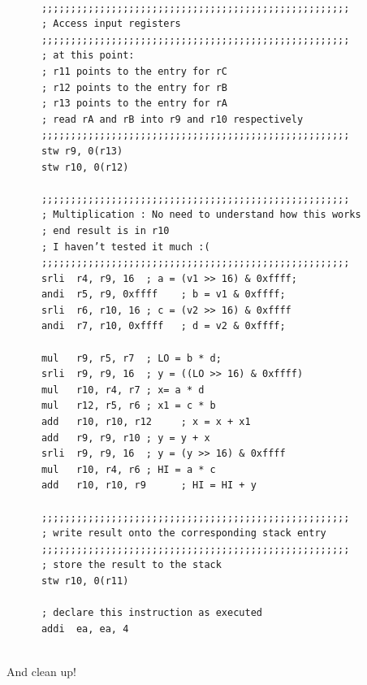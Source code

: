 \documentclass[../notes.tex]{subfiles}
\begin{document}
\begin{listing}[H]
\begin{verbatim}
 
      ;;;;;;;;;;;;;;;;;;;;;;;;;;;;;;;;;;;;;;;;;;;;;;;;;;;;;
      ; Access input registers
      ;;;;;;;;;;;;;;;;;;;;;;;;;;;;;;;;;;;;;;;;;;;;;;;;;;;;;
      ; at this point:
      ; r11 points to the entry for rC
      ; r12 points to the entry for rB
      ; r13 points to the entry for rA
      ; read rA and rB into r9 and r10 respectively
      ;;;;;;;;;;;;;;;;;;;;;;;;;;;;;;;;;;;;;;;;;;;;;;;;;;;;;
      stw r9, 0(r13)
      stw r10, 0(r12)
 
      ;;;;;;;;;;;;;;;;;;;;;;;;;;;;;;;;;;;;;;;;;;;;;;;;;;;;;
      ; Multiplication : No need to understand how this works
      ; end result is in r10
      ; I haven’t tested it much :(
      ;;;;;;;;;;;;;;;;;;;;;;;;;;;;;;;;;;;;;;;;;;;;;;;;;;;;;
      srli  r4, r9, 16  ; a = (v1 >> 16) & 0xffff;
      andi  r5, r9, 0xffff    ; b = v1 & 0xffff;
      srli  r6, r10, 16 ; c = (v2 >> 16) & 0xffff
      andi  r7, r10, 0xffff   ; d = v2 & 0xffff;
 
      mul   r9, r5, r7  ; LO = b * d;
      srli  r9, r9, 16  ; y = ((LO >> 16) & 0xffff)
      mul   r10, r4, r7 ; x= a * d
      mul   r12, r5, r6 ; x1 = c * b
      add   r10, r10, r12     ; x = x + x1
      add   r9, r9, r10 ; y = y + x
      srli  r9, r9, 16  ; y = (y >> 16) & 0xffff
      mul   r10, r4, r6 ; HI = a * c
      add   r10, r10, r9      ; HI = HI + y
 
      ;;;;;;;;;;;;;;;;;;;;;;;;;;;;;;;;;;;;;;;;;;;;;;;;;;;;;
      ; write result onto the corresponding stack entry
      ;;;;;;;;;;;;;;;;;;;;;;;;;;;;;;;;;;;;;;;;;;;;;;;;;;;;;
      ; store the result to the stack
      stw r10, 0(r11)
 
      ; declare this instruction as executed
      addi  ea, ea, 4


\end{verbatim}
\end{listing}

And clean up!
\end{document}
